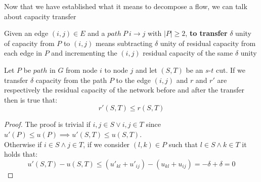 Now that we have established what it means to decompose a flow, we can talk about capacity transfer
\begin{definition}[Tranfer]
    Given an edge $(i,j) \in E$ and a $path\ P\ i\rightarrow j$ with $|P|\ge 2$, \textbf{to transfer} $\delta$ unity of capacity from $P$ to $(i,j)$ means subtracting $\delta$ unity of residual capacity from each edge in $P$ and incrementing the $(i,j)$ residual capacity of the same $\delta$ unity
\end{definition}
\begin{lemma}
    Let $P$ be $path$ in $G$ from node $i$ to node $j$ and let $(S,T)$ be an $s$-$t$ cut. 
    If we transfer $\delta$ capacity from the path $P$ to the edge $(i, j)$ and $r$ and $r'$ are respectively the residual capacity of the network before and after the transfer then is true that:
    \[r'(S,T) \le r(S,T)\] 
\end{lemma}
\begin{proof}
    The proof is trivial if $i,j \in S \lor i,j \in T$ since $u'(P) \le u(P) \implies u'(S,T)\le u(S,T)$.\\
    Otherwise if $i\in S \land j \in T$, if we consider $(l,k)\in P$ such that $l \in S\land k\in T$ it holds that:
    \[u'(S,T)-u(S,T)\le (u'_{kl}+u'_{ij})- (u_{kl}+u_{ij}) = -\delta + \delta = 0\]
\end{proof}


